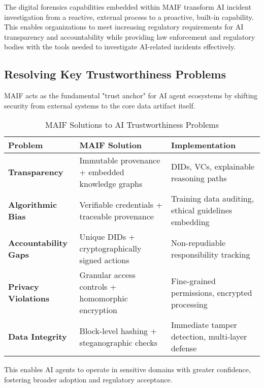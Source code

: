 \documentclass[conference]{IEEEtran}
\begin{document}
The digital forensics capabilities embedded within MAIF transform AI incident investigation from a reactive, external process to a proactive, built-in capability. This enables organizations to meet increasing regulatory requirements for AI transparency and accountability while providing law enforcement and regulatory bodies with the tools needed to investigate AI-related incidents effectively.

\subsection{Resolving Key Trustworthiness Problems}

MAIF acts as the fundamental "trust anchor" for AI agent ecosystems by shifting security from external systems to the core data artifact itself.

\begin{table*}[!t]
\renewcommand{\arraystretch}{1.3}
\caption{MAIF Solutions to AI Trustworthiness Problems}
\label{tab:trustworthiness-solutions}
\centering
\footnotesize
\begin{tabular}{p{3cm}p{5.5cm}p{5.5cm}}
\toprule
\textbf{Problem} & \textbf{MAIF Solution} & \textbf{Implementation} \\
\midrule
\textbf{Transparency} & Immutable provenance + embedded knowledge graphs & DIDs, VCs, explainable reasoning paths \\
\textbf{Algorithmic Bias} & Verifiable credentials + traceable provenance & Training data auditing, ethical guidelines embedding \\
\textbf{Accountability Gaps} & Unique DIDs + cryptographically signed actions & Non-repudiable responsibility tracking \\
\textbf{Privacy Violations} & Granular access controls + homomorphic encryption & Fine-grained permissions, encrypted processing \\
\textbf{Data Integrity} & Block-level hashing + steganographic checks & Immediate tamper detection, multi-layer defense \\
\bottomrule
\end{tabular}
\end{table*}

This enables AI agents to operate in sensitive domains with greater confidence, fostering broader adoption and regulatory acceptance.
\end{document}
